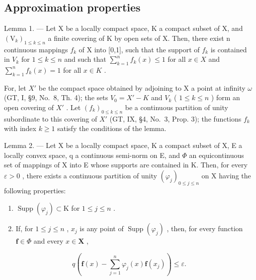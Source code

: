 \subsection{Approximation properties}

Lemma 1. --- Let X be a locally compact space, K a compact subset of X, and \((\mathrm{V}_{k})_{1\leqslant k\leqslant n}\) a finite covering of K by open sets of X. Then, there exist n continuous mappings \(f_{k}\) of X into {[}0,1{]}, such that the support of \(f_{k}\) is contained in \(V_{k}\) for \(1\leqslant k\leqslant n\) and such that \(\sum_{k=1}^{n}f_{k}(x)\leqslant1\) for all \(x\in X\) and \(\sum_{k=1}^{n}f_{k}(x)=1\) for all \(x\in K\) .

For, let \(X'\) be the compact space obtained by adjoining to X a point at infinity \(\omega\) (GT, I, §9, No.~8, Th. 4); the sets \(V_{0} = X' - K\) and \(V_{k}\) ( \(1 \leqslant k \leqslant n\) ) form an open covering of \(X'\) . Let \((f_{k})_{0 \leqslant k \leqslant n}\) be a continuous partition of unity subordinate to this covering of \(X'\) (GT, IX, §4, No.~3, Prop. 3); the functions \(f_{k}\) with index \(k \geqslant 1\) satisfy the conditions of the lemma.

Lemma 2. --- Let X be a locally compact space, K a compact subset of X, E a locally convex space, q a continuous semi-norm on E, and \(\Phi\) an equicontinuous set of mappings of X into E whose supports are contained in K. Then, for every \(\varepsilon > 0\) , there exists a continuous partition of unity \((\varphi_{j})_{0 \leqslant j \leqslant n}\) on X having the following properties:

\begin{enumerate}
\def\labelenumi{(\roman{enumi})}
\item
  \(\operatorname{Supp}(\varphi_j) \subset \mathrm{K}\) for \(1 \leqslant j \leqslant n\) .
\item
  If, for \(1 \leqslant j \leqslant n\) , \(x_j\) is any point of \(\operatorname{Supp}(\varphi_j)\) , then, for every function \(\mathbf{f} \in \Phi\) and every \(x \in \mathbf{X}\) ,
\end{enumerate}

\[
q \left(\mathbf {f} (x) - \sum_ {j = 1} ^ {n} \varphi_ {j} (x) \mathbf {f} \left(x _ {j}\right)\right) \leqslant \varepsilon .\tag{1}
\]

